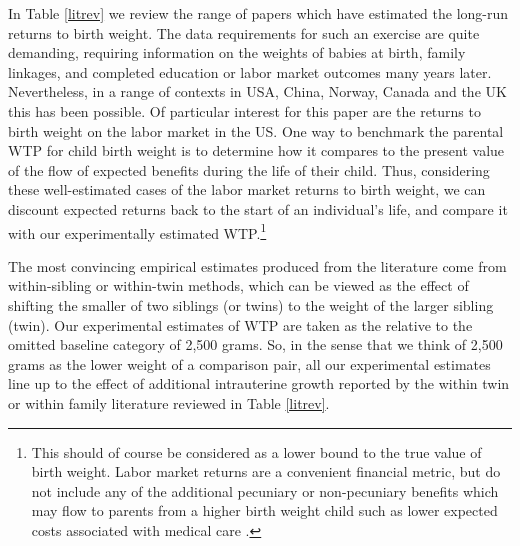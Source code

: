 \documentclass[a4paper, 11pt]{article}
\begin{document}
\begin{spacing}{1.4}
In Table \ref{litrev} we review the range of papers which have estimated
the long-run returns to birth weight.  The data requirements for such an
exercise are quite demanding, requiring information on the weights of
babies at birth, family linkages, and completed education or labor market
outcomes many years later.  Nevertheless, in a range of contexts in USA,
China, Norway, Canada and the UK this has been possible.  Of
particular interest for this paper are the returns to birth weight on
the labor market in the US.  One way to benchmark the parental WTP for child
birth weight is to determine how it compares to the present value of the
flow of expected benefits during the life of their child. Thus,
considering these well-estimated cases of the labor market returns to
birth weight, we can discount expected returns back to the start of an
individual's life, and compare it with our experimentally estimated
WTP.\footnote{This should of course be considered as a lower bound to
  the true value of birth weight.  Labor market returns are a convenient
  financial metric, but do not include any of the additional pecuniary or
  non-pecuniary benefits which may flow to parents from a higher birth weight
  child such as lower expected costs associated with medical care
  \citep{Almondetal2005}.}


The most convincing empirical estimates
produced from the literature come from within-sibling or within-twin
methods, which can be viewed as the effect of shifting the smaller of
two siblings (or twins) to the weight of the larger sibling (twin).
Our experimental estimates of WTP are taken as the relative to the
omitted baseline category of 2,500 grams.  So, in the sense that we
think of 2,500 grams as the lower weight of a comparison pair, all
our experimental estimates line up to the effect of additional
intrauterine growth reported by the within twin or within family
literature reviewed in Table \ref{litrev}.


\end{spacing}
\end{document}
